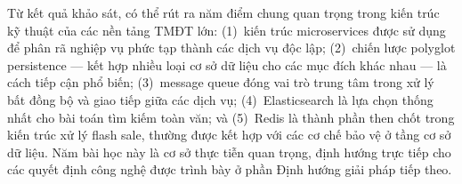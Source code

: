 \documentclass[../DoAn.tex]{subfiles}
\begin{document}
Từ kết quả khảo sát, có thể rút ra năm điểm chung quan trọng trong kiến trúc kỹ thuật của
các nền tảng TMĐT lớn: (1)~kiến trúc microservices được sử dụng để phân rã nghiệp vụ phức
tạp thành các dịch vụ độc lập; (2)~chiến lược polyglot persistence --- kết hợp nhiều loại
cơ sở dữ liệu cho các mục đích khác nhau --- là cách tiếp cận phổ biến; (3)~message queue
đóng vai trò trung tâm trong xử lý bất đồng bộ và giao tiếp giữa các dịch vụ; (4)~Elasticsearch
là lựa chọn thống nhất cho bài toán tìm kiếm toàn văn; và (5)~Redis là thành phần then chốt
trong kiến trúc xử lý flash sale, thường được kết hợp với các cơ chế bảo vệ ở tầng cơ sở dữ
liệu. Năm bài học này là cơ sở thực tiễn quan trọng, định hướng trực tiếp cho các quyết định
công nghệ được trình bày ở phần Định hướng giải pháp tiếp theo.





\end{document}

